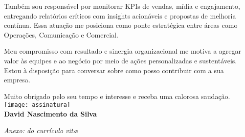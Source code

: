 \begin{commentA}
\noindent Também sou responsável por monitorar KPIs de vendas, mídia e engajamento, entregando relatórios críticos com insights acionáveis e propostas de melhoria contínua. Essa atuação me posiciona como ponte estratégica entre áreas como Operações, Comunicação e Comercial.

\vspace{1.5em} %
Meu compromisso com resultado e sinergia organizacional me motiva a agregar valor às equipes e ao negócio por meio de ações personalizadas e sustentáveis. Estou à disposição para conversar sobre como posso contribuir com a sua empresa.

\raggedleft%
Muito obrigado pelo seu tempo e interesse e receba uma calorosa saudação.\\[0.1em]
\texttt{[image: assinatura]}\\[-0.1em]
{\bfseries David Nascimento da Silva}~~~~~~~~~~~\vspace*{-0.5em}
%
\vfill%
\raggedright%
{\slshape Anexo: do currículo vit\ae{}}%
\end{commentA}
\begin{commentB}

\end{commentB}
\begin{commentC}

\end{commentC}
\begin{commentD}

\end{commentD}
\begin{commentE}

\end{commentE}
\begin{commentF}

\end{commentF}
\begin{commentG}

\end{commentG}
\begin{commentH}

\end{commentH}
\begin{commentI}

\end{commentI}
